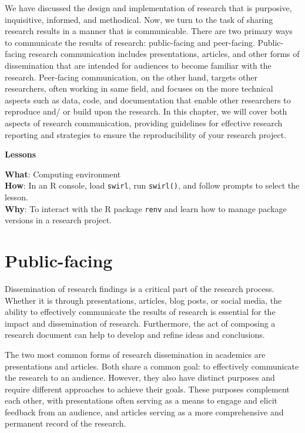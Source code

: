 \documentclass[
  letterpaper,
]{latex/krantz}
\theoremstyle{definition}
\theoremstyle{remark}
\begin{document}
We have discussed the design and implementation of research that is
purposive, inquisitive, informed, and methodical. Now, we turn to the
task of sharing research results in a manner that is communicable. There
are two primary ways to communicate the results of research:
public-facing and peer-facing. Public-facing research communication
includes presentations, articles, and other forms of dissemination that
are intended for audiences to become familiar with the research.
Peer-facing communication, on the other hand, targets other researchers,
often working in same field, and focuses on the more technical aspects
such as data, code, and documentation that enable other researchers to
reproduce and/ or build upon the research. In this chapter, we will
cover both aspects of research communication, providing guidelines for
effective research reporting and strategies to ensure the
reproducibility of your research project.

\begin{tcolorbox}[enhanced jigsaw, colframe=quarto-callout-color-frame, breakable, bottomrule=.15mm, arc=.35mm, left=2mm, opacityback=0, rightrule=.15mm, colback=white, toprule=.15mm, leftrule=.75mm]

\textbf{ Lessons}

\textbf{What}: Computing environment\\
\textbf{How}: In an R console, load \texttt{swirl}, run
\texttt{swirl()}, and follow prompts to select the lesson.\\
\textbf{Why}: To interact with the R package \texttt{renv} and learn how
to manage package versions in a research project.

\end{tcolorbox}

\section{Public-facing}\label{sec-contr-public-facing}

Dissemination of research findings is a critical part of the research
process. Whether it is through presentations, articles, blog posts, or
social media, the ability to effectively communicate the results of
research is essential for the impact and dissemination of research.
Furthermore, the act of composing a research document can help to
develop and refine ideas and conclusions.

The two most common forms of research dissemination in academics are
presentations and articles. Both share a common goal: to effectively
communicate the research to an audience. However, they also have
distinct purposes and require different approaches to achieve their
goals. These purposes complement each other, with presentations often
serving as a means to engage and elicit feedback from an audience, and
articles serving as a more comprehensive and permanent record of the
research.
\end{document}
